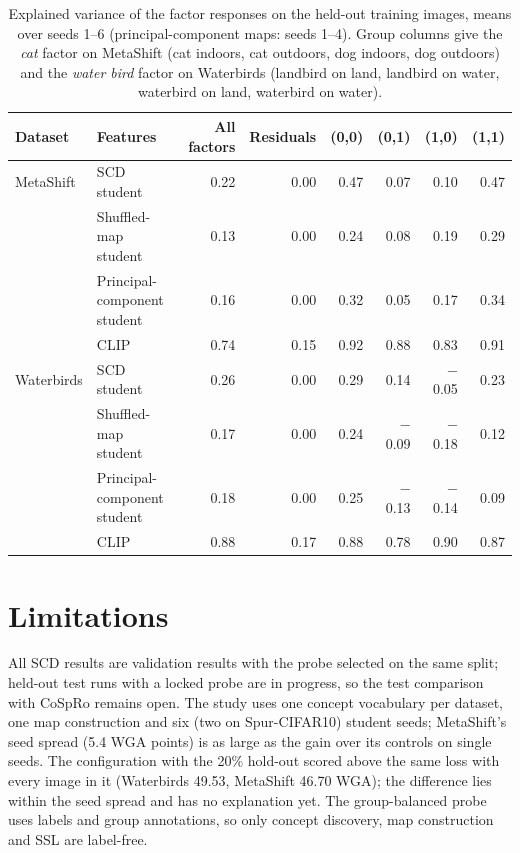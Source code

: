 \documentclass{article}
\begin{document}
\begin{table}[htbp]
\centering\small
\setlength{\tabcolsep}{4pt}
\caption{Explained variance of the factor responses on the held-out training images, means over seeds 1--6 (principal-component maps: seeds 1--4). Group columns give the \emph{cat} factor on MetaShift (cat indoors, cat outdoors, dog indoors, dog outdoors) and the \emph{water bird} factor on Waterbirds (landbird on land, landbird on water, waterbird on land, waterbird on water).}
\begin{tabular}{llrrrrrr}
\toprule
Dataset & Features & All factors & Residuals & (0,0) & (0,1) & (1,0) & (1,1) \\
\midrule
MetaShift & SCD student & 0.22 & 0.00 & 0.47 & 0.07 & 0.10 & 0.47 \\
& Shuffled-map student & 0.13 & 0.00 & 0.24 & 0.08 & 0.19 & 0.29 \\
& Principal-component student & 0.16 & 0.00 & 0.32 & 0.05 & 0.17 & 0.34 \\
& CLIP & 0.74 & 0.15 & 0.92 & 0.88 & 0.83 & 0.91 \\
\addlinespace
Waterbirds & SCD student & 0.26 & 0.00 & 0.29 & 0.14 & $-$0.05 & 0.23 \\
& Shuffled-map student & 0.17 & 0.00 & 0.24 & $-$0.09 & $-$0.18 & 0.12 \\
& Principal-component student & 0.18 & 0.00 & 0.25 & $-$0.13 & $-$0.14 & 0.09 \\
& CLIP & 0.88 & 0.17 & 0.88 & 0.78 & 0.90 & 0.87 \\
\bottomrule
\end{tabular}
\label{tab:audit}
\end{table}

\section{Limitations}
All SCD results are validation results with the probe selected on the same split; held-out test runs with a locked probe are in progress, so the test comparison with CoSpRo remains open. The study uses one concept vocabulary per dataset, one map construction and six (two on Spur-CIFAR10) student seeds; MetaShift's seed spread (5.4 WGA points) is as large as the gain over its controls on single seeds. The configuration with the 20\% hold-out scored above the same loss with every image in it (Waterbirds 49.53, MetaShift 46.70 WGA); the difference lies within the seed spread and has no explanation yet. The group-balanced probe uses labels and group annotations, so only concept discovery, map construction and SSL are label-free.
\end{document}
